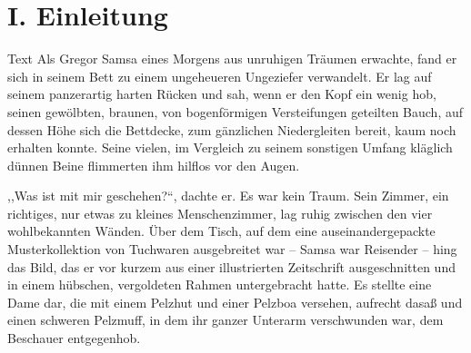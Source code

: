 \documentclass[]{zchinr}
\begin{document}

\printtitle

\printissuetoc



\printtitle

\section{I. Einleitung}

Text Als Gregor Samsa eines Morgens aus unruhigen Träumen erwachte, fand er sich in seinem Bett zu einem ungeheueren Ungeziefer verwandelt. Er lag auf seinem panzerartig harten Rücken und sah, wenn er den Kopf ein wenig hob, seinen gewölbten, braunen, von bogenförmigen Versteifungen geteilten Bauch, auf dessen Höhe sich die Bettdecke, zum gänzlichen Niedergleiten bereit, kaum noch erhalten konnte. Seine vielen, im Vergleich zu seinem sonstigen Umfang kläglich dünnen Beine flimmerten ihm hilflos vor den Augen.

,,Was ist mit mir geschehen?{}``, dachte er. Es war kein Traum. Sein Zimmer, ein richtiges, nur etwas zu kleines Menschenzimmer, lag ruhig zwischen den vier wohlbekannten Wänden. Über dem Tisch, auf dem eine auseinandergepackte Musterkollektion von Tuchwaren ausgebreitet war -- Samsa war Reisender -- hing das Bild, das er vor kurzem aus einer illustrierten Zeitschrift ausgeschnitten und in einem hübschen, vergoldeten Rahmen untergebracht hatte. Es stellte eine Dame dar, die mit einem Pelzhut und einer Pelzboa versehen, aufrecht dasaß und einen schweren Pelzmuff, in dem ihr ganzer Unterarm verschwunden war, dem Beschauer entgegenhob.
\end{document}
